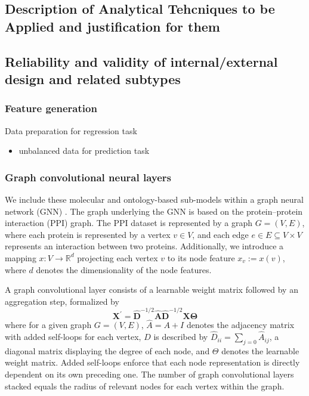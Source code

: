 \documentclass[]{article}
\renewcommand{\cite}{\citep}
\begin{document}
\subsection*{Description of Analytical Tehcniques to be Applied and justification for them}

\subsection*{Reliability and validity of internal/external design and related subtypes}

\subsubsection{Feature generation}

Data preparation for regression task
\begin{itemize}
	\item unbalanced data for prediction task
\end{itemize}

\subsubsection{Graph convolutional neural layers}

We include these molecular and ontology-based sub-models within a
graph neural network (GNN) \cite{GCNConv}. The graph underlying the GNN is
based on the protein--protein interaction (PPI) graph. The PPI dataset
is represented by a graph $G=(V,E)$, where each protein is represented
by a vertex $v\in V$, and each edge $e\in E\subseteq V\times V$
represents an interaction between two proteins. Additionally, we
introduce a mapping $x:V\rightarrow\mathbb{R}^{d}$ projecting each
vertex $v$ to its node feature $x_v := x(v)$, where $d$ denotes the
dimensionality of the node features.

A graph convolutional layer \cite{GCNConv} consists of a learnable
weight matrix followed by an aggregation step, formalized by
\begin{equation}
	\mathbf{X}^{\prime} = \mathbf{\hat{D}}^{-1/2} \mathbf{\hat{A}}
	\mathbf{\hat{D}}^{-1/2} \mathbf{X} \mathbf{\Theta}
\end{equation}
where for a given graph $G=(V,E)$, $\hat{A} = A + I$ denotes the
adjacency matrix with added self-loops for each vertex, $D$ is
described by $\hat{D}_{ii} = \sum_{j=0} \hat{A}_{ij}$, a diagonal
matrix displaying the degree of each node, and $\Theta$ denotes the
learnable weight matrix. Added self-loops enforce that each node
representation is directly dependent on its own preceding one. The
number of graph convolutional layers stacked equals the radius of
relevant nodes for each vertex within the graph.
\end{document}
